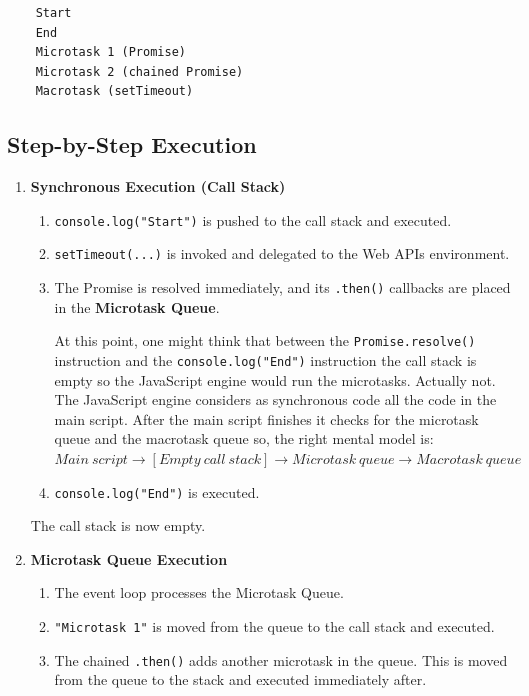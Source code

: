 \documentclass{scrbook}
\begin{document}
\begin{lstlisting}
    Start
    End
    Microtask 1 (Promise)
    Microtask 2 (chained Promise)
    Macrotask (setTimeout)
\end{lstlisting}

\subsection{Step-by-Step Execution}

\begin{enumerate}
    \item \textbf{Synchronous Execution (Call Stack)}
    \begin{enumerate}[label*=\arabic*.]
        \item \texttt{console.log("Start")} is pushed to the call stack and executed.
        \item \texttt{setTimeout(...)} is invoked and delegated to the Web APIs environment.
        \item The Promise is resolved immediately, and its \texttt{.then()} callbacks are placed in the \textbf{Microtask Queue}.

        At this point, one might think that between the \texttt{Promise.resolve()} instruction and the \texttt{console.log("End")} instruction the call stack is empty so the JavaScript engine would run the microtasks. Actually not. The JavaScript engine considers as synchronous code all the code in the main script. After the main script finishes it checks for the microtask queue and the macrotask queue so, the right mental model is:\\
        $Main~script\rightarrow [Empty~call~stack]\rightarrow Microtask~queue\rightarrow Macrotask~queue$
        
        \item \texttt{console.log("End")} is executed.
    \end{enumerate}

	The call stack is now empty.
	
    \item \textbf{Microtask Queue Execution}
    \begin{enumerate}[label*=\arabic*.]
        \item The event loop processes the Microtask Queue.
        \item \texttt{"Microtask 1"} is moved from the queue to the call stack and executed.
        \item The chained \texttt{.then()} adds another microtask in the queue. This is moved from the queue to the stack and executed immediately after.
    \end{enumerate}
    

\end{enumerate}
\end{document}
